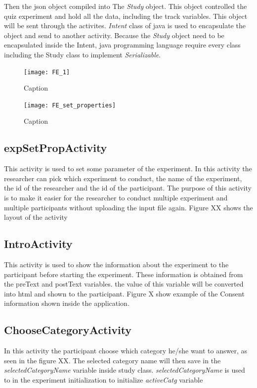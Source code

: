 Then the json object compiled into The \textit{Study} object. This object controlled the quiz experiment and hold all the data, including the track variables.
This object will be sent through the activites.
\textit{Intent} class of java is used to encapsulate the object and send to another activity.
Because the \textit{Study} object need to be encapsulated inside the Intent,
 java programming language require every class including the Study class to implement \textit{Serializable}.


\begin{figure}
\centering
\begin{minipage}[b]{.4\textwidth}
\texttt{[image: FE\_1]}
\caption{Caption}\label{label-a}
\end{minipage}\qquad
\begin{minipage}[b]{.4\textwidth}
\texttt{[image: FE\_set\_properties]}
\caption{Caption}\label{label-b}
\end{minipage}
\end{figure}

\subsection{expSetPropActivity}
This activity is used to set some parameter of the experiment. In this activity the researcher can pick which experiment to conduct, the name of the experiment,
the id of the researcher and the id of the participant.
The purpose of this activity is to make it easier for the researcher to conduct multiple experiment and multiple participants without uploading the input file again.
 Figure XX shows the layout of the activity

\subsection{IntroActivity}
This activity is used to show the information about the experiment to the participant before starting the experiment.
These information is obtained from the preText and postText variables. the value of this variable will be converted into html and shown to the participant.
Figure X show example of the Consent information shown inside the application.

\subsection{ChooseCategoryActivity}
In this activity the participant choose which category he/she want to answer, as seen in the figure XX.
The selected category name will then save in the \textit{selectedCategoryName} variable inside study class.
\textit{selectedCategoryName} is used to in the experiment initialization to initialize \textit{activeCatg} variable


